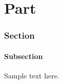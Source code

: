 \documentclass[12pt,a4paper]{article}
\begin{document}

%

%
%
%


\part{Part}
\section{Section}
\subsection{Subsection}

Sample text here.









\end{document}
